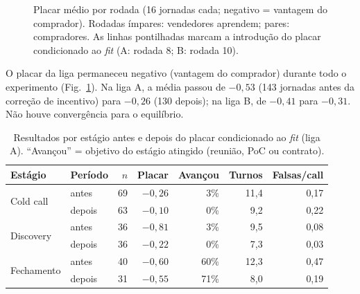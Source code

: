 \documentclass[11pt,a4paper]{article}
\begin{document}
\begin{figure}[h]
\centering
{}
\caption{Placar médio por rodada (16 jornadas cada; negativo = vantagem do comprador). Rodadas ímpares: vendedores aprendem; pares: compradores. As linhas pontilhadas marcam a introdução do placar condicionado ao \emph{fit} (A: rodada 8; B: rodada 10).}
\label{fig:curva}
\end{figure}

O placar da liga permaneceu negativo (vantagem do comprador) durante todo o experimento (Fig.~\ref{fig:curva}). Na liga A, a média passou de $-0{,}53$ (143 jornadas antes da correção de incentivo) para $-0{,}26$ (130 depois); na liga B, de $-0{,}41$ para $-0{,}31$. Não houve convergência para o equilíbrio.

\begin{table}[h]
\centering
\caption{Resultados por estágio antes e depois do placar condicionado ao \emph{fit} (liga A). ``Avançou'' = objetivo do estágio atingido (reunião, PoC ou contrato).}
\label{tab:estagios}
\begin{tabular}{llrrrrr}
\toprule
Estágio & Período & $n$ & Placar & Avançou & Turnos & Falsas/call \\
\midrule
\multirow{2}{*}{Cold call} & antes & 69 & $-0{,}26$ & 3\% & 11,4 & 0,17 \\
 & depois & 63 & $-0{,}10$ & 0\% & 9,2 & 0,22 \\
\multirow{2}{*}{Discovery} & antes & 36 & $-0{,}81$ & 3\% & 9,5 & 0,08 \\
 & depois & 36 & $-0{,}22$ & 0\% & 7,3 & 0,03 \\
\multirow{2}{*}{Fechamento} & antes & 40 & $-0{,}60$ & 60\% & 12,3 & 0,47 \\
 & depois & 31 & $-0{,}55$ & 71\% & 8,0 & 0,19 \\
\bottomrule
\end{tabular}
\end{table}
\end{document}
